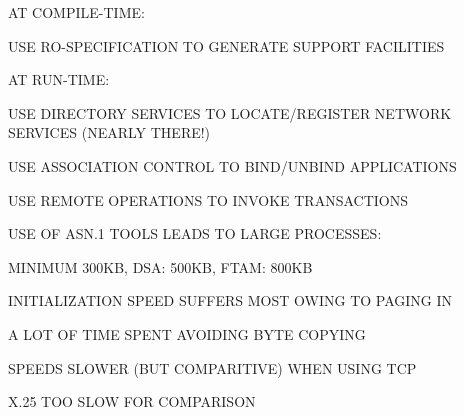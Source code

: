 \begin{bwslide}

\begin{nrtc}
\item	AT COMPILE-TIME:
    \begin{nrtc}
    \item	USE RO-SPECIFICATION TO GENERATE SUPPORT FACILITIES
    \end{nrtc}

\item	AT RUN-TIME:
    \begin{nrtc}
    \item	USE DIRECTORY SERVICES TO LOCATE/REGISTER NETWORK SERVICES
		(NEARLY THERE!)

    \item	USE ASSOCIATION CONTROL TO BIND/UNBIND APPLICATIONS

    \item	USE REMOTE OPERATIONS TO INVOKE TRANSACTIONS
    \end{nrtc}
\end{nrtc}
\end{bwslide}






\begin{bwslide}

\begin{nrtc}
\item	USE OF ASN.1 TOOLS LEADS TO LARGE PROCESSES:
    \begin{nrtc}
    \item	MINIMUM 300KB, DSA: 500KB, FTAM: 800KB

    \item	INITIALIZATION SPEED SUFFERS MOST OWING TO PAGING IN
    \end{nrtc}

\item	A LOT OF TIME SPENT AVOIDING BYTE COPYING

\item	SPEEDS SLOWER (BUT COMPARITIVE) WHEN USING TCP

\item	X.25 TOO SLOW FOR COMPARISON
\end{nrtc}
\end{bwslide}


